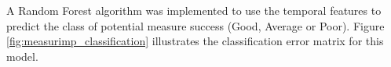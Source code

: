 A Random Forest algorithm was implemented to use the temporal features to predict the class of potential measure success (Good, Average or Poor). Figure \ref{fig:measurimp_classification} illustrates the classification error matrix for this model. 